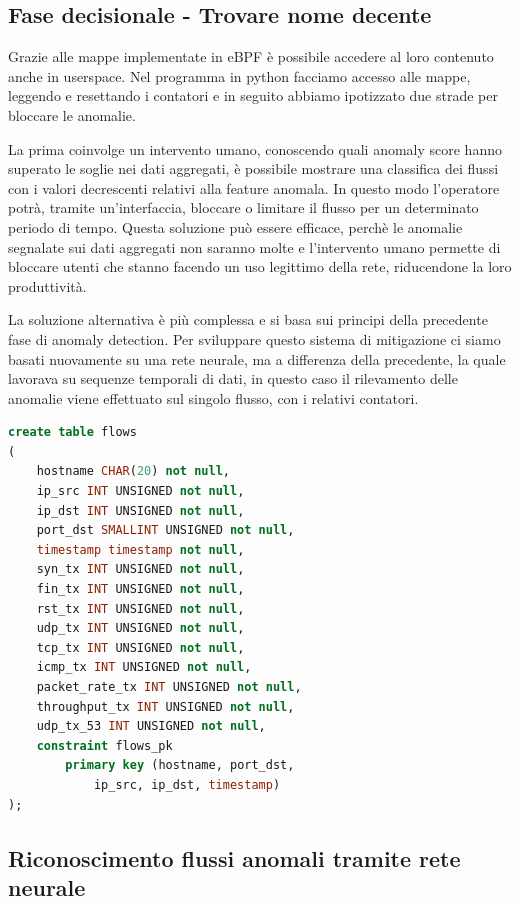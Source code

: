 \subsection{Fase decisionale - Trovare nome decente}

Grazie alle mappe implementate in eBPF è possibile accedere al loro contenuto anche in userspace. Nel programma in python facciamo accesso alle mappe, leggendo e resettando i contatori e in seguito abbiamo ipotizzato due strade per bloccare le anomalie.

La prima coinvolge un intervento umano, conoscendo quali anomaly score hanno superato le soglie nei dati aggregati, è possibile mostrare una classifica dei flussi con i valori decrescenti relativi alla feature anomala. In questo modo l'operatore potrà, tramite un'interfaccia, bloccare o limitare il flusso per un determinato periodo di tempo. Questa soluzione può essere efficace, perchè le anomalie segnalate sui dati aggregati non saranno molte e l'intervento umano permette di bloccare utenti che stanno facendo un uso legittimo della rete, riducendone la loro produttività.

La soluzione alternativa è più complessa e si basa sui principi della precedente fase di anomaly detection.
Per sviluppare questo sistema di mitigazione ci siamo basati nuovamente su una rete neurale, ma a differenza della precedente, la quale lavorava su sequenze temporali di dati, in questo caso il rilevamento delle anomalie viene effettuato sul singolo flusso, con i relativi contatori.

\begin{lstlisting}[language=SQL,caption={Esempio di tabella nel database SQL.}]
create table flows
(
    hostname CHAR(20) not null,
    ip_src INT UNSIGNED not null,
    ip_dst INT UNSIGNED not null,
    port_dst SMALLINT UNSIGNED not null,
    timestamp timestamp not null,
    syn_tx INT UNSIGNED not null,
    fin_tx INT UNSIGNED not null,
    rst_tx INT UNSIGNED not null,
    udp_tx INT UNSIGNED not null,
    tcp_tx INT UNSIGNED not null,
    icmp_tx INT UNSIGNED not null,
    packet_rate_tx INT UNSIGNED not null,
    throughput_tx INT UNSIGNED not null,
    udp_tx_53 INT UNSIGNED not null,
    constraint flows_pk
        primary key (hostname, port_dst,
            ip_src, ip_dst, timestamp)
);
\end{lstlisting}

\subsection{Riconoscimento flussi anomali tramite rete neurale}

